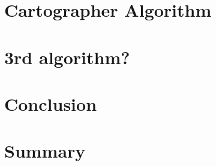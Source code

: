 \documentclass[12pt, a4paper, onecolumn]{article}
\begin{document}
\section{Cartographer Algorithm}

\section{3rd algorithm?}

\section{Conclusion}

\section{Summary}
\end{document}
